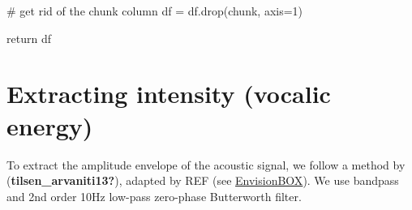 \documentclass[
  letterpaper,
  DIV=11,
  numbers=noendperiod]{scrreprt}
\newenvironment{Shaded}{\begin{snugshade}}{\end{snugshade}}
\newcommand{\CommentTok}[1]{\textcolor[rgb]{0.37,0.37,0.37}{#1}}
\newcommand{\ControlFlowTok}[1]{\textcolor[rgb]{0.00,0.23,0.31}{#1}}
\newcommand{\DecValTok}[1]{\textcolor[rgb]{0.68,0.00,0.00}{#1}}
\newcommand{\NormalTok}[1]{\textcolor[rgb]{0.00,0.23,0.31}{#1}}
\newcommand{\OperatorTok}[1]{\textcolor[rgb]{0.37,0.37,0.37}{#1}}
\newcommand{\StringTok}[1]{\textcolor[rgb]{0.13,0.47,0.30}{#1}}
\begin{document}
\begin{Shaded}
\begin{Highlighting}[]
    \CommentTok{\# get rid of the chunk column}
\NormalTok{    df }\OperatorTok{=}\NormalTok{ df.drop(}\StringTok{\textquotesingle{}chunk\textquotesingle{}}\NormalTok{, axis}\OperatorTok{=}\DecValTok{1}\NormalTok{)}

    \ControlFlowTok{return}\NormalTok{ df}
\end{Highlighting}
\end{Shaded}


\chapter{Extracting intensity (vocalic
energy)}\label{extracting-intensity-vocalic-energy}

To extract the amplitude envelope of the acoustic signal, we follow a
method by (\textbf{tilsen\_arvaniti13?}), adapted by REF (see
\href{https://www.envisionbox.org/embedded_AnimatingSoundMovement.html}{EnvisionBOX}).
We use bandpass and 2nd order 10Hz low-pass zero-phase Butterworth
filter.
\end{document}
